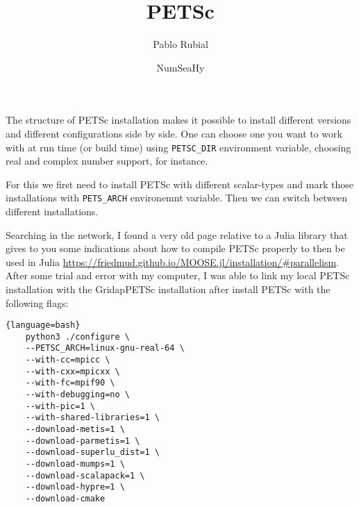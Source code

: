 \documentclass{article}[a4paper, 12pt]
\title{PETSc}
\author{Pablo Rubial}
\date{NumSeaHy}
\begin{document}
\maketitle

The structure of PETSc installation makes it possible to install different versions and different configurations side by side. One can choose one you want to work with at run time (or build time) using \texttt{PETSC\_DIR} environment variable, choosing real and complex number support, for instance.

For this we first need to install PETSc with different scalar-types and mark those installations with \texttt{PETS\_ARCH} environemnt variable. Then we can switch between different installations.

    
    
    


Searching in the network, I found a very old page relative to a Julia library that gives to you some indications about how to compile PETSc properly to then be used in Julia \url{https://friedmud.github.io/MOOSE.jl/installation/#parallelism}. After some trial and error with my computer, I was able to link my local PETSc installation with the GridapPETSc installation after install PETSc with the following flags:

\begin{lstlisting}{language=bash}
    python3 ./configure \                                                     
    --PETSC_ARCH=linux-gnu-real-64 \ 
    --with-cc=mpicc \ 
    --with-cxx=mpicxx \
    --with-fc=mpif90 \
    --with-debugging=no \
    --with-pic=1 \
    --with-shared-libraries=1 \
    --download-metis=1 \
    --download-parmetis=1 \
    --download-superlu_dist=1 \
    --download-mumps=1 \
    --download-scalapack=1 \
    --download-hypre=1 \
    --download-cmake
\end{lstlisting}
\end{document}
